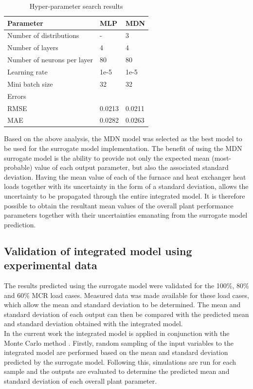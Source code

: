 \documentclass[a4paper,fleqn]{cas-sc}
\begin{document}
\begin{table}[h!]
\caption{Hyper-parameter search results}\label{tbl_hyper_results}
\begin{tabular*}{\tblwidth}{p{}p{}p{}}
\toprule
 Parameter& MLP & MDN \\ %
\midrule
 Number of distributions & - & 3  \\
 Number of layers & 4 & 4\\
 Number of neurons per layer & 80  & 80\\
 Learning rate & 1e-5 &  1e-5   \\
 Mini batch size  &32 & 32  \\
\midrule
Errors & &\\
\midrule
RMSE & 0.0213 & 0.0211\\
MAE & 0.0282& 0.0263\\
\bottomrule
\end{tabular*}
\end{table}  

Based on the above analysis, the MDN model was selected as the best model to be used for the surrogate model implementation. The benefit of using the MDN surrogate model is the ability to provide not only the expected mean (most-probable) value of each output parameter, but also the associated standard deviation. Having the mean value of each of the furnace and heat exchanger heat loads together with its uncertainty in the form of a standard deviation, allows the uncertainty to be propagated through the entire integrated model. It is therefore possible to obtain the resultant mean values of the overall plant performance parameters together with their uncertainties emanating from the surrogate model prediction.



\subsection{Validation of integrated model using experimental data}\label{sec_result_1}
The results predicted using the surrogate model were validated for the 100\%, 80\% and 60\% MCR load cases. Measured data was made available for these load cases, which allow the mean and standard deviation to be determined.  The mean and standard deviation of each output can then be compared with the predicted mean and standard deviation obtained with the integrated model.\\

In the current work the integrated model is applied in conjunction with the Monte Carlo method \cite{Thomopoulos2013}. Firstly, random sampling of the input variables to the integrated model are performed based on the mean and standard deviation predicted by the surrogate model.  Following this, simulations are run for each sample and the outputs are evaluated to determine the predicted mean and standard deviation of each overall plant parameter.\\
\end{document}
